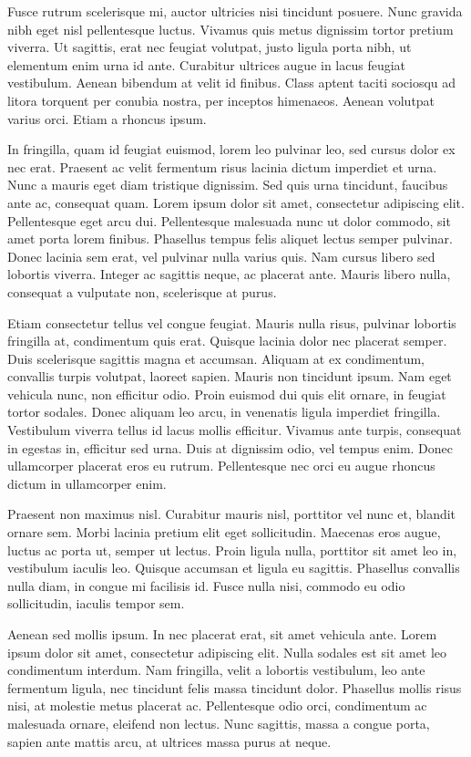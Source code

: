 \documentclass[a4paper,11pt]{article}
\begin{document}
Fusce rutrum scelerisque mi, auctor ultricies nisi tincidunt posuere. Nunc gravida nibh eget nisl pellentesque luctus. Vivamus quis metus dignissim tortor pretium viverra. Ut sagittis, erat nec feugiat volutpat, justo ligula porta nibh, ut elementum enim urna id ante. Curabitur ultrices augue in lacus feugiat vestibulum. Aenean bibendum at velit id finibus. Class aptent taciti sociosqu ad litora torquent per conubia nostra, per inceptos himenaeos. Aenean volutpat varius orci. Etiam a rhoncus ipsum.

In fringilla, quam id feugiat euismod, lorem leo pulvinar leo, sed cursus dolor ex nec erat. Praesent ac velit fermentum risus lacinia dictum imperdiet et urna. Nunc a mauris eget diam tristique dignissim. Sed quis urna tincidunt, faucibus ante ac, consequat quam. Lorem ipsum dolor sit amet, consectetur adipiscing elit. Pellentesque eget arcu dui. Pellentesque malesuada nunc ut dolor commodo, sit amet porta lorem finibus. Phasellus tempus felis aliquet lectus semper pulvinar. Donec lacinia sem erat, vel pulvinar nulla varius quis. Nam cursus libero sed lobortis viverra. Integer ac sagittis neque, ac placerat ante. Mauris libero nulla, consequat a vulputate non, scelerisque at purus.

Etiam consectetur tellus vel congue feugiat. Mauris nulla risus, pulvinar lobortis fringilla at, condimentum quis erat. Quisque lacinia dolor nec placerat semper. Duis scelerisque sagittis magna et accumsan. Aliquam at ex condimentum, convallis turpis volutpat, laoreet sapien. Mauris non tincidunt ipsum. Nam eget vehicula nunc, non efficitur odio. Proin euismod dui quis elit ornare, in feugiat tortor sodales. Donec aliquam leo arcu, in venenatis ligula imperdiet fringilla. Vestibulum viverra tellus id lacus mollis efficitur. Vivamus ante turpis, consequat in egestas in, efficitur sed urna. Duis at dignissim odio, vel tempus enim. Donec ullamcorper placerat eros eu rutrum. Pellentesque nec orci eu augue rhoncus dictum in ullamcorper enim.

Praesent non maximus nisl. Curabitur mauris nisl, porttitor vel nunc et, blandit ornare sem. Morbi lacinia pretium elit eget sollicitudin. Maecenas eros augue, luctus ac porta ut, semper ut lectus. Proin ligula nulla, porttitor sit amet leo in, vestibulum iaculis leo. Quisque accumsan et ligula eu sagittis. Phasellus convallis nulla diam, in congue mi facilisis id. Fusce nulla nisi, commodo eu odio sollicitudin, iaculis tempor sem.

Aenean sed mollis ipsum. In nec placerat erat, sit amet vehicula ante. Lorem ipsum dolor sit amet, consectetur adipiscing elit. Nulla sodales est sit amet leo condimentum interdum. Nam fringilla, velit a lobortis vestibulum, leo ante fermentum ligula, nec tincidunt felis massa tincidunt dolor. Phasellus mollis risus nisi, at molestie metus placerat ac. Pellentesque odio orci, condimentum ac malesuada ornare, eleifend non lectus. Nunc sagittis, massa a congue porta, sapien ante mattis arcu, at ultrices massa purus at neque.
\end{document}
